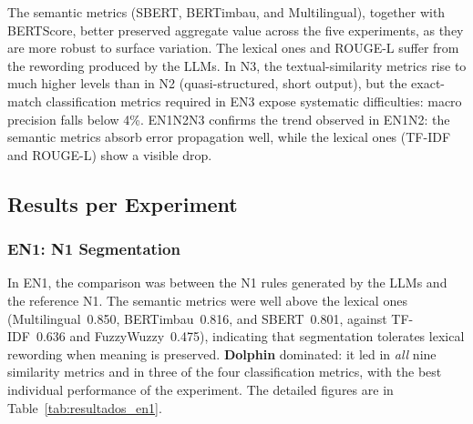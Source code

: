 \documentclass[a4paper,fleqn]{cas-sc}
\begin{document}
The semantic metrics (SBERT, BERTimbau, and Multilingual), together with BERTScore, better preserved aggregate value across the five experiments, as they are more robust to surface variation. The lexical ones and ROUGE-L suffer from the rewording produced by the LLMs. In N3, the textual-similarity metrics rise to much higher levels than in N2 (quasi-structured, short output), but the exact-match classification metrics required in EN3 expose systematic difficulties: macro precision falls below 4\%. EN1N2N3 confirms the trend observed in EN1N2: the semantic metrics absorb error propagation well, while the lexical ones (TF-IDF and ROUGE-L) show a visible drop.

\subsection{Results per Experiment}

\subsubsection{EN1: N1 Segmentation}

In EN1, the comparison was between the N1 rules generated by the LLMs and the reference N1. The semantic metrics were well above the lexical ones (Multilingual~0.850, BERTimbau~0.816, and SBERT~0.801, against TF-IDF~0.636 and FuzzyWuzzy~0.475), indicating that segmentation tolerates lexical rewording when meaning is preserved. \textbf{Dolphin} dominated: it led in \textit{all} nine similarity metrics and in three of the four classification metrics, with the best individual performance of the experiment. The detailed figures are in Table~\ref{tab:resultados_en1}.
\end{document}
